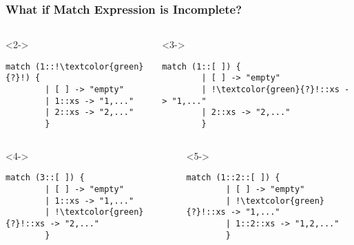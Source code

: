 \documentclass[notheorems]{beamer}
\theoremstyle{slplain}
\numberwithin{thm}{section}
\begin{document}
\begin{frame}[fragile]
  \frametitle{What if Match Expression is Incomplete?}
  \begin{columns}
    \begin{column}{5cm}
      \begin{onlyenv}<2->
      \begin{lstlisting}[name=not exhaustive,title={Expression hole},captionpos=b,escapechar=!]
        match (1::!\textcolor{green}{?}!) {
        | [ ] -> "empty"
        | 1::xs -> "1,..."
        | 2::xs -> "2,..."
        }
      \end{lstlisting}
    \end{onlyenv}
    \end{column}

    \begin{column}{5cm}
      \begin{onlyenv}<3->
      \begin{lstlisting}[name=redundant,title={Pattern hole},captionpos=b,escapechar=!]
        match (1::[ ]) {
        | [ ] -> "empty"
        | !\textcolor{green}{?}!::xs -> "1,..."
        | 2::xs -> "2,..."
        }
      \end{lstlisting}
      \end{onlyenv}
    \end{column}
  \end{columns}
  \begin{columns}
    \begin{column}{5cm}
      \begin{onlyenv}<4->
      \begin{lstlisting}[title={Exhaustive?},captionpos=b,escapechar=!]
        match (3::[ ]) {
        | [ ] -> "empty"
        | 1::xs -> "1,..."
        | !\textcolor{green}{?}!::xs -> "2,..."
        }
      \end{lstlisting}
      \end{onlyenv}
    \end{column}

    \begin{column}{5cm}
      \begin{onlyenv}<5->
      \begin{lstlisting}[title={Redundant?},captionpos=b,escapechar=!]
        match (1::2::[ ]) {
        | [ ] -> "empty"
        | !\textcolor{green}{?}!::xs -> "1,..."
        | 1::2::xs -> "1,2,..."
        }
      \end{lstlisting}
      \end{onlyenv}
    \end{column}
  \end{columns}
\end{frame}
\end{document}
